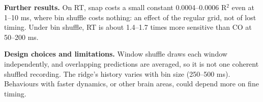 \documentclass[11pt]{article}
\begin{document}
\textbf{Further results.} On RT, snap costs a small constant 0.0004--0.0006 R$^{2}$ even at 1--10 ms, where bin shuffle costs nothing: an effect of the regular grid, not of lost timing. Under bin shuffle, RT is about 1.4--1.7 times more sensitive than CO at 50--200 ms.

\textbf{Design choices and limitations.} Window shuffle draws each window independently, and overlapping predictions are averaged, so it is not one coherent shuffled recording. The ridge's history varies with bin size (250--500 ms). Behaviours with faster dynamics, or other brain areas, could depend more on fine timing.
\end{document}
